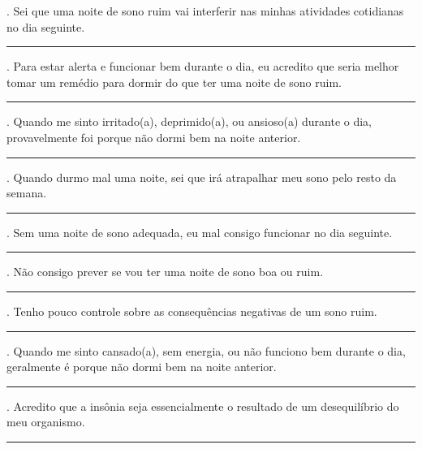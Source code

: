 \begin{appendix}
\begin{flushleft}
{. Sei que uma noite de sono ruim vai interferir nas minhas atividades cotidianas no dia seguinte.
\medskip
\hrule
\medskip
\hspace*{6mm} \par

. Para estar alerta e funcionar bem durante o dia, eu acredito que seria melhor tomar um remédio para dormir do que ter uma noite de sono ruim.
\medskip
\hrule
\medskip
\hspace*{6mm} \par

. Quando me sinto irritado(a), deprimido(a), ou ansioso(a) durante o dia, provavelmente foi porque não dormi bem na noite anterior. 
\medskip
\hrule
\medskip
\hspace*{6mm} \par

. Quando durmo mal uma noite, sei que irá atrapalhar meu sono pelo resto da semana. 
\medskip
\hrule
\medskip
\hspace*{6mm} \par

.	Sem uma noite de sono adequada, eu mal consigo funcionar no dia seguinte. 
\medskip
\hrule
\medskip
\hspace*{6mm} \par

.	Não consigo prever se vou ter uma noite de sono boa ou ruim. 
\medskip
\hrule
\medskip
\hspace*{6mm} \par

.	Tenho pouco controle sobre as consequências negativas de um sono ruim. 
\medskip
\hrule
\medskip
\hspace*{6mm} \par

.	Quando me sinto cansado(a), sem energia, ou não funciono bem durante o dia, geralmente é porque não dormi bem na noite anterior. 
\medskip
\hrule
\medskip
\hspace*{6mm} \par

.	Acredito que a insônia seja essencialmente o resultado de um desequilíbrio do meu organismo. 
\medskip
\hrule
\medskip
\hspace*{6mm} \par

}
\end{flushleft}
\end{appendix}
